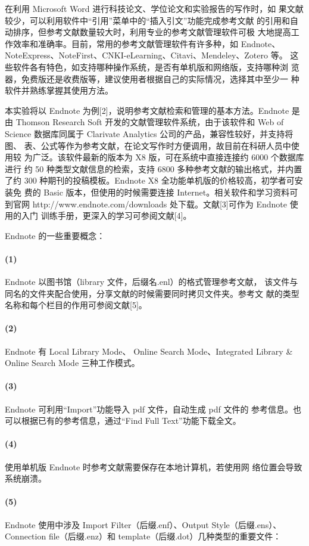\documentclass[12pt,a4paper,UTF8]{ctexart}
\begin{document}
在利用 Microsoft Word 进行科技论文、学位论文和实验报告的写作时，如
果文献较少，可以利用软件中“引用”菜单中的“插入引文”功能完成参考文献
的引用和自动排序，但参考文献数量较大时，利用专业的参考文献管理软件可极
大地提高工作效率和准确率。目前，常用的参考文献管理软件有许多种，如
Endnote、NoteExpress、NoteFirst、CNKI-eLearning、Citavi、Mendeley、Zotero 等。
这些软件各有特色，如支持哪种操作系统，是否有单机版和网络版，支持哪种浏
览器，免费版还是收费版等，建议使用者根据自己的实际情况，选择其中至少一
种软件并熟练掌握其使用方法。

本实验将以 Endnote 为例[2]，说明参考文献检索和管理的基本方法。Endnote
是由 Thomson Research Soft 开发的文献管理软件系统，由于该软件和 Web of
Science 数据库同属于 Clarivate Analytics 公司的产品，兼容性较好，并支持将图、
表、公式等作为参考文献，在论文写作时方便调用，故目前在科研人员中使用较
为广泛。该软件最新的版本为 X8 版，可在系统中直接连接约 6000 个数据库进行
约 50 种类型文献信息的检索，支持 6800 多种参考文献的输出格式，并内置了约
300 种期刊的投稿模板。Endnote X8 全功能单机版的价格较高，初学者可安装免
费的 Basic 版本，但使用的时候需要连接 Internet。相关软件和学习资料可到官网
http://www.endnote.com/downloads 处下载。文献[3]可作为 Endnote 使用的入门
训练手册，更深入的学习可参阅文献[4]。

Endnote 的一些重要概念：


\paragraph*{(1)} 
Endnote 以图书馆（library 文件，后缀名.enl）的格式管理参考文献，
该文件与同名的文件夹配合使用，分享文献的时候需要同时拷贝文件夹。参考文
献的类型名称和每个栏目的作用可参阅文献[5]。
\paragraph*{(2)} 
Endnote 有 Local Library Mode、 Online Search Mode、Integrated
Library \& Online Search Mode 三种工作模式。
\paragraph*{(3)} 
Endnote 可利用“Import”功能导入 pdf 文件，自动生成 pdf 文件的
参考信息。也可以根据已有的参考信息，通过“Find Full Text”功能下载全文。
\paragraph*{(4)} 
使用单机版 Endnote 时参考文献需要保存在本地计算机，若使用网
络位置会导致系统崩溃。
\paragraph*{(5)} 
Endnote 使用中涉及 Import Filter（后缀.enf）、Output Style（后缀.ens）、
Connection file（后缀.enz）和 template（后缀.dot）几种类型的重要文件：
\end{document}
